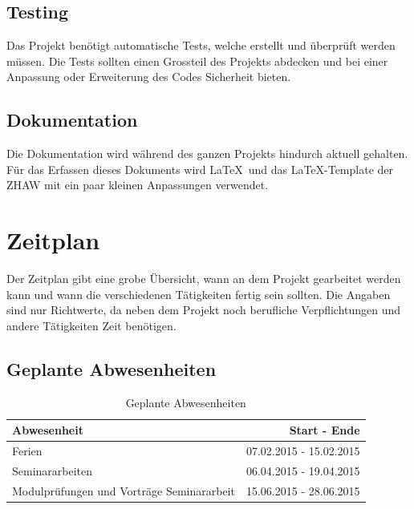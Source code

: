 \subsection{Testing}\label{testing}
Das Projekt benötigt automatische Tests, welche erstellt und überprüft werden müssen. Die Tests sollten einen Grossteil des Projekts abdecken und bei einer Anpassung oder Erweiterung des 
Codes Sicherheit bieten.

\subsection{Dokumentation}\label{dokumentation}
Die Dokumentation wird während des ganzen Projekts hindurch aktuell gehalten. Für das Erfassen dieses Dokuments wird \LaTeX\ und das \LaTeX-Template der ZHAW \cite{zhaw_latex_template} mit ein 
paar kleinen Anpassungen verwendet.

\section{Zeitplan}\label{zeitplan}
Der Zeitplan gibt eine grobe Übersicht, wann an dem Projekt gearbeitet werden kann und wann die verschiedenen Tätigkeiten fertig sein sollten. Die Angaben sind nur Richtwerte, da neben dem 
Projekt noch berufliche Verpflichtungen und andere Tätigkeiten Zeit benötigen.

\subsection{Geplante Abwesenheiten}
\begin{table}[ht]
\centering
  \begin{tabular}{ l | r }
	\hline
	\rowcolor{gray}
	\textbf{Abwesenheit}					&	\textbf{Start - Ende}	\\ \hline
	Ferien								&	07.02.2015 - 15.02.2015	\\ \hline
	Seminararbeiten						&	06.04.2015 - 19.04.2015	\\ \hline
	Modulprüfungen und Vorträge Seminararbeit		&	15.06.2015 - 28.06.2015	\\ \hline
  \end{tabular}
   \caption{Geplante Abwesenheiten}\label{table:holidays}
\end{table}


